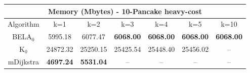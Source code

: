 \begin{tabular}{c|cccccc}\toprule
\multicolumn{7}{c}{Memory (Mbytes) - 10-Pancake heavy-cost}\\ \midrule
Algorithm & k=1 & k=2 & k=3 & k=4 & k=5 & k=10 \\ \midrule
BELA$_0$ & 5995.18 & 6077.47 & \textbf{6068.00} & \textbf{6068.00} & \textbf{6068.00} & \textbf{6068.00} \\
K$_0$ & 24872.32 & 25250.15 & 25425.54 & 25448.40 & 25456.02 & -- \\
mDijkstra & \textbf{4697.24} & \textbf{5531.04} & -- & -- & -- & -- \\ \bottomrule 
\end{tabular}
